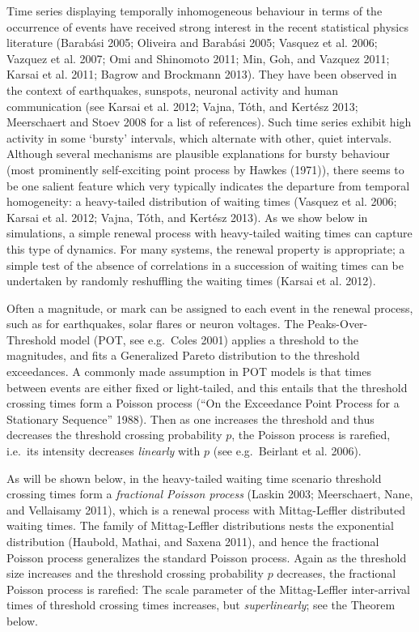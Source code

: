 \documentclass[]{elsarticle} %
\begin{document}
Time series displaying temporally inhomogeneous behaviour in terms of
the occurrence of events have received strong interest in the recent
statistical physics literature (Barabási 2005; Oliveira and Barabási
2005; Vasquez et al. 2006; Vazquez et al. 2007; Omi and Shinomoto 2011;
Min, Goh, and Vazquez 2011; Karsai et al. 2011; Bagrow and Brockmann
2013). They have been observed in the context of earthquakes, sunspots,
neuronal activity and human communication (see Karsai et al. 2012;
Vajna, Tóth, and Kertész 2013; Meerschaert and Stoev 2008 for a list of
references). Such time series exhibit high activity in some `bursty'
intervals, which alternate with other, quiet intervals. Although several
mechanisms are plausible explanations for bursty behaviour (most
prominently self-exciting point process by Hawkes (1971)), there seems
to be one salient feature which very typically indicates the departure
from temporal homogeneity: a heavy-tailed distribution of waiting times
(Vasquez et al. 2006; Karsai et al. 2012; Vajna, Tóth, and Kertész
2013). As we show below in simulations, a simple renewal process with
heavy-tailed waiting times can capture this type of dynamics. For many
systems, the renewal property is appropriate; a simple test of the
absence of correlations in a succession of waiting times can be
undertaken by randomly reshuffling the waiting times (Karsai et al.
2012).

Often a magnitude, or mark can be assigned to each event in the renewal
process, such as for earthquakes, solar flares or neuron voltages. The
Peaks-Over-Threshold model (POT, see e.g.~Coles 2001) applies a
threshold to the magnitudes, and fits a Generalized Pareto distribution
to the threshold exceedances. A commonly made assumption in POT models
is that times between events are either fixed or light-tailed, and this
entails that the threshold crossing times form a Poisson process (``On
the Exceedance Point Process for a Stationary Sequence'' 1988). Then as
one increases the threshold and thus decreases the threshold crossing
probability \(p\), the Poisson process is rarefied, i.e.~its intensity
decreases \emph{linearly} with \(p\) (see e.g.~Beirlant et al. 2006).

As will be shown below, in the heavy-tailed waiting time scenario
threshold crossing times form a \emph{fractional Poisson process}
(Laskin 2003; Meerschaert, Nane, and Vellaisamy 2011), which is a
renewal process with Mittag-Leffler distributed waiting times. The
family of Mittag-Leffler distributions nests the exponential
distribution (Haubold, Mathai, and Saxena 2011), and hence the
fractional Poisson process generalizes the standard Poisson process.
Again as the threshold size increases and the threshold crossing
probability \(p\) decreases, the fractional Poisson process is rarefied:
The scale parameter of the Mittag-Leffler inter-arrival times of
threshold crossing times increases, but \emph{superlinearly}; see the
Theorem below.
\end{document}
